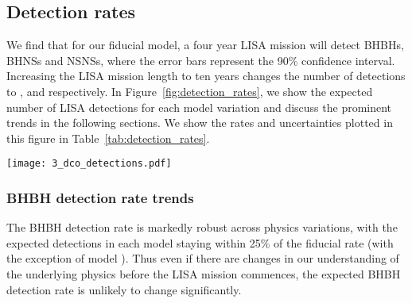 \subsection{Detection rates}\label{sec:detection_rate_analysis}
We find that for our fiducial model, a four year LISA mission will detect  BHBHs,  BHNSs and  NSNSs, where the error bars represent the 90\% confidence interval. Increasing the LISA mission length to ten years changes the number of detections to ,  and  respectively. In Figure~\ref{fig:detection_rates}, we show the expected number of LISA detections for each model variation and discuss the prominent trends in the following sections. We show the rates and uncertainties plotted in this figure in Table~\ref{tab:detection_rates}.

\begin{figure*}[p]
    \centering
    \texttt{[image: 3\_dco\_detections.pdf]}
    \caption{The number of expected detections in the LISA mission for different DCO types and model variations. Error bars show the 50\% (solid) and 90\% (dotted) confidence intervals. The left axis and grid lines show the number of detections in a four year LISA mission and the right axis shows an approximation of the number of detections in a 10 year mission (we scale the axis by $\sqrt{T_{\rm obs}}$, see Table~\ref{tab:detection_rates} for exact rates). Each model is described in further detail in Table~\ref{tab:physics_variations} and details of the fiducial assumptions are in Section~\ref{sec:fiducial_physics}. }
    \label{fig:detection_rates}
\end{figure*}

\subsubsection{BHBH detection rate trends}
The BHBH detection rate is markedly robust across physics variations, with the expected detections in each model staying within 25\% of the fiducial rate (with the exception of model \modOpt{}). Thus even if there are changes in our understanding of the underlying physics before the LISA mission commences, the expected BHBH detection rate is unlikely to change significantly.

